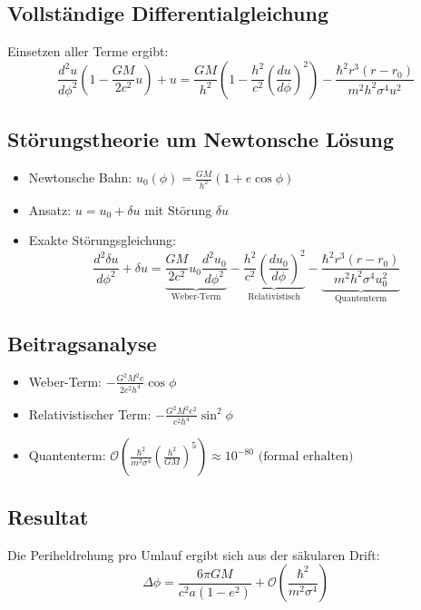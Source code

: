 \subsection{Vollständige Differentialgleichung}
Einsetzen aller Terme ergibt:
\begin{equation}
\frac{d^2 u}{d\phi^2} \left(1 - \frac{GM}{2c^2} u \right) + u = \frac{GM}{h^2} \left(1 - \frac{h^2}{c^2} \left(\frac{du}{d\phi}\right)^2 \right) - \frac{\hbar^2 r^3 (r - r_0)}{m^2 h^2 \sigma^4 u^2}
\end{equation}

\subsection{Störungstheorie um Newtonsche Lösung}
\begin{itemize}
\item Newtonsche Bahn: $u_0(\phi) = \frac{GM}{h^2}(1 + e \cos\phi)$
\item Ansatz: $u = u_0 + \delta u$ mit Störung $\delta u$
\item Exakte Störungsgleichung:
\begin{equation}
\frac{d^2 \delta u}{d\phi^2} + \delta u = \underbrace{\frac{GM}{2c^2} u_0 \frac{d^2 u_0}{d\phi^2}}_{\text{Weber-Term}} - \underbrace{\frac{h^2}{c^2} \left(\frac{du_0}{d\phi}\right)^2}_{\text{Relativistisch}} - \underbrace{\frac{\hbar^2 r^3 (r - r_0)}{m^2 h^2 \sigma^4 u_0^2}}_{\text{Quantenterm}}
\end{equation}
\end{itemize}

\subsection{Beitragsanalyse}
\begin{itemize}
\item Weber-Term: $-\frac{G^2 M^2 e}{2c^2 h^4} \cos\phi$
\item Relativistischer Term: $-\frac{G^2 M^2 e^2}{c^2 h^4} \sin^2\phi$
\item Quantenterm: $\mathcal{O}\left(\frac{\hbar^2}{m^2 \sigma^4}\left(\frac{h^2}{GM}\right)^5\right) \approx 10^{-80} \text{ (formal erhalten)}$
\end{itemize}

\subsection{Resultat}
Die Periheldrehung pro Umlauf ergibt sich aus der säkularen Drift:
\begin{equation}
\Delta \phi = \frac{6\pi GM}{c^2 a(1 - e^2)} + \mathcal{O}\left(\frac{\hbar^2}{m^2 \sigma^4}\right)
\end{equation}


